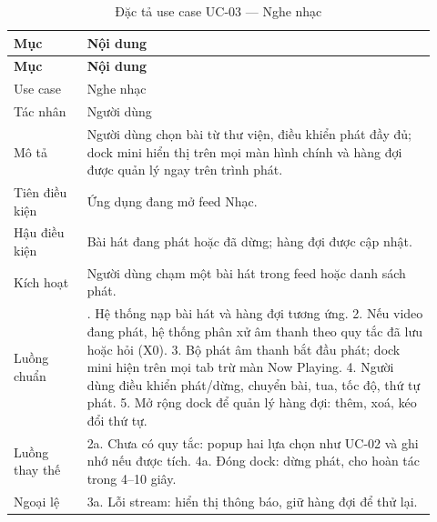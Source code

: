 \begingroup\small\renewcommand{\arraystretch}{1.15}\setlength{\tabcolsep}{3pt}
\begin{longtable}{>{\RaggedRight\arraybackslash}p{0.16\linewidth}>{\RaggedRight\arraybackslash}p{0.76\linewidth}}
\caption{Đặc tả use case UC-03 --- Nghe nhạc}
\label{tab:spec-uc-03}\\
\toprule
\textbf{Mục} & \textbf{Nội dung} \\
\midrule
\endfirsthead
\toprule
\textbf{Mục} & \textbf{Nội dung} \\
\midrule
\endhead
\bottomrule
\endfoot
Use case & Nghe nhạc \\
Tác nhân & Người dùng \\
Mô tả & Người dùng chọn bài từ thư viện, điều khiển phát đầy đủ; dock mini hiển thị trên mọi màn hình chính và hàng đợi được quản lý ngay trên trình phát. \\
Tiên điều kiện & Ứng dụng đang mở feed Nhạc. \\
Hậu điều kiện & Bài hát đang phát hoặc đã dừng; hàng đợi được cập nhật. \\
Kích hoạt & Người dùng chạm một bài hát trong feed hoặc danh sách phát. \\
Luồng chuẩn & 1. Hệ thống nạp bài hát và hàng đợi tương ứng. 2. Nếu video đang phát, hệ thống phân xử âm thanh theo quy tắc đã lưu hoặc hỏi (X0). 3. Bộ phát âm thanh bắt đầu phát; dock mini hiện trên mọi tab trừ màn Now Playing. 4. Người dùng điều khiển phát/dừng, chuyển bài, tua, tốc độ, thứ tự phát. 5. Mở rộng dock để quản lý hàng đợi: thêm, xoá, kéo đổi thứ tự. \\
Luồng thay thế & 2a. Chưa có quy tắc: popup hai lựa chọn như UC-02 và ghi nhớ nếu được tích. 4a. Đóng dock: dừng phát, cho hoàn tác trong 4--10 giây. \\
Ngoại lệ & 3a. Lỗi stream: hiển thị thông báo, giữ hàng đợi để thử lại. \\
\end{longtable}
\endgroup

